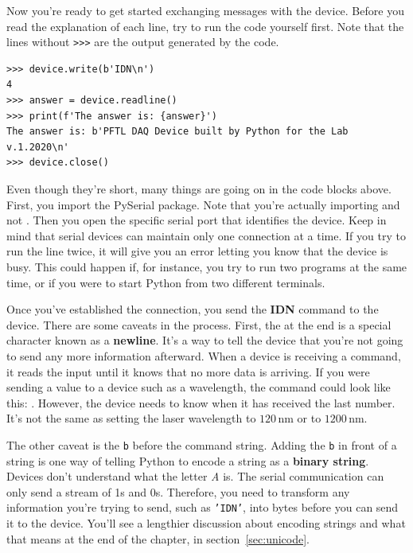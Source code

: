 Now you're ready to get started exchanging messages with the device. Before you read the explanation of each line, try to run the code yourself first. Note that the lines without \texttt{>>>} are the output generated by the code.

\begin{verbatim}
>>> device.write(b'IDN\n')
4
>>> answer = device.readline()
>>> print(f'The answer is: {answer}')
The answer is: b'PFTL DAQ Device built by Python for the Lab v.1.2020\n'
>>> device.close()
\end{verbatim}

Even though they're short, many things are going on in the code blocks above. First, you import the PySerial package. Note that you're actually importing  and not . Then you open the specific serial port that identifies the device. Keep in mind that serial devices can maintain only one connection at a time. If you try to run the line twice, it will give you an error letting you know that the device is busy. This could happen if, for instance, you try to run two programs at the same time, or if you were to start Python from two different terminals.

Once you've established the connection, you send the \textbf{{IDN}} command to the device. There are some caveats in the process. First, the \texttt{\n} at the end is a special character known as a \textbf{newline}. It's a way to tell the device that you're not going to send any more information afterward. When a device is receiving a command, it reads the input until it knows that no more data is arriving. If you were sending a value to a device such as a wavelength, the command could look like this: . However, the device needs to know when it has received the last number. It's not the same as setting the laser wavelength to $120\,\textrm{nm}$ or to $1200\,\textrm{nm}$.

The other caveat is the \texttt{b} before the command string. Adding the \texttt{b} in front of a string is one way of telling Python to encode a string as a \textbf{binary string}. Devices don't understand what the letter \textit{A} is. The serial communication can only send a stream of 1s and 0s. Therefore, you need to transform any information you're trying to send, such as \texttt{'IDN'}, into bytes before you can send it to the device. You'll see a lengthier discussion about encoding strings and what that means at the end of the chapter, in section~\ref{sec:unicode}.


